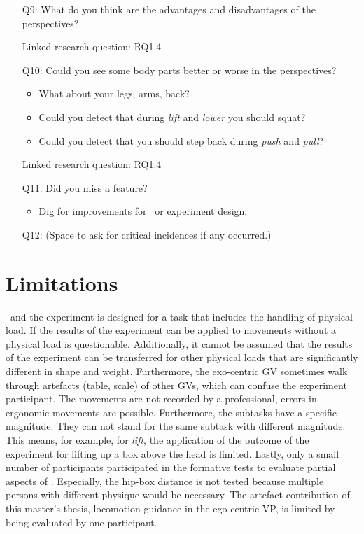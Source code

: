 \begin{itemize}
	\item[Q9:] What do you think are the advantages and disadvantages of the perspectives?
	\item[] Linked research question: RQ1.4
	
	\item[Q10:] Could you see some body parts better or worse in the perspectives?
	\begin{itemize}
		\item What about your legs, arms, back?
		\item Could you detect that during \textit{lift} and \textit{lower} you should squat?
		\item Could you detect that you should step back during \textit{push} and \textit{pull}?
	\end{itemize}
	\item[] Linked research question: RQ1.4
	
	\item[Q11:] Did you miss a feature?
	\begin{itemize}
		\item Dig for improvements for \exgo\ or experiment design.
	\end{itemize}
	
	\item[Q12:] (Space to ask for critical incidences if any occurred.)
\end{itemize}

\section{Limitations}
\label{sec:limitations}
\exgo\ and the experiment is designed for a task that includes the handling of physical load. If the results of the experiment can be applied to movements without a physical load is questionable. Additionally, it cannot be assumed that the results of the experiment can be transferred for other physical loads that are significantly different in shape and weight. Furthermore, the exo-centric GV sometimes walk through artefacts (table, scale) of other GVs, which can confuse the experiment participant. The movements are not recorded by a professional, errors in ergonomic movements are possible. Furthermore, the subtasks have a specific magnitude. They can not stand for the same subtask with different magnitude. This means, for example, for \textit{lift}, the application of the outcome of the experiment for lifting up a box above the head is limited. Lastly, only a small number of participants participated in the formative tests to evaluate partial aspects of \exgo. Especially, the hip-box distance is not tested because multiple persons with different physique would be necessary. The artefact contribution of this master's thesis, locomotion guidance in the ego-centric VP, is limited by being evaluated by one participant.\\

